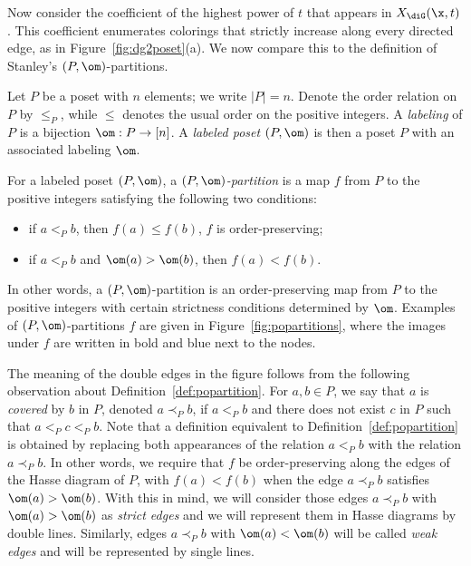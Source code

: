 Now consider the coefficient of the highest power of $t$ that appears in $X_{\diG}(\x, t)$.  This coefficient enumerates colorings that strictly increase along every directed edge, as in Figure~\ref{fig:dg2poset}(a).  We now compare this to the definition of Stanley's $(P,\om)$-partitions.

Let $P$ be a poset with $n$ elements; we write $|P|=n$.  Denote the order relation on $P$ by $\leq_P$, while $\leq$ denotes the usual order on the positive integers.  A \emph{labeling} of $P$ is a bijection $\om : P \to [n]$.  A \emph{labeled poset} $(P,\om)$ is then a poset $P$ with an associated labeling $\om$.  

\begin{definition}\label{def:popartition}
For a labeled poset $(P,\om)$, a \emph{$(P,\om)$-partition} is a map $f$ from $P$ to the positive integers satisfying the following two conditions:
\begin{itemize}
\item if $a <_P b$, then $f(a) \leq f(b)$, \ie $f$ is order-preserving;
\item if $a <_P b$ and $\om(a) > \om(b)$, then $f(a) < f(b)$.
\end{itemize}
\end{definition}
In other words, a $(P,\om)$-partition is an order-preserving map from $P$ to the positive integers with certain strictness conditions determined by $\om$.  Examples of $(P,\om)$-partitions $f$ are given in Figure~\ref{fig:popartitions}, where the images under $f$ are written in bold and blue next to the nodes.  

The meaning of the double edges in the figure follows from the following observation about Definition~\ref{def:popartition}.  For $a, b \in P$, we say that $a$ is \emph{covered} by $b$ in $P$, denoted $a \prec_P b$, if $a <_P b$ and there does not exist $c$ in $P$ such that $a <_P c <_P b$.  Note that a definition equivalent to Definition~\ref{def:popartition} is obtained by replacing both appearances of the relation $a <_P b$ with the relation $a \prec_P b$.  In other words, we require that $f$ be order-preserving along the edges of the Hasse diagram of $P$, with $f(a) < f(b)$ when the edge $a \prec_P b$ satisfies $\om(a) > \om(b)$.  With this in mind, we will consider those edges $a \prec_P b$ with $\om(a) > \om(b)$ as \emph{strict edges} and we will represent them in Hasse diagrams by double lines.  Similarly, edges $a \prec_P b$ with $\om(a) < \om(b)$ will be called \emph{weak edges} and will be represented by single lines.  

